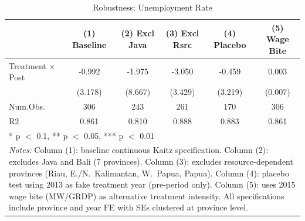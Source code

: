 \begin{table}
\centering
\caption{Robustness: Unemployment Rate}
\label{tab:robustness}
\centering\small
\begin{tabular}[t]{lccccc}
\toprule
  & (1) Baseline & (2) Excl Java & (3) Excl Rsrc & (4) Placebo & (5) Wage Bite\\
\midrule
Treatment $\times$ Post & -0.992 & -1.975 & -3.050 & -0.459 & 0.003\\
 & (3.178) & (8.667) & (3.429) & (3.219) & (0.007)\\
\midrule
Num.Obs. & 306 & 243 & 261 & 170 & 306\\
R2 & 0.861 & 0.810 & 0.888 & 0.883 & 0.861\\
\bottomrule
\multicolumn{6}{l}{\rule{0pt}{1em}* p $<$ 0.1, ** p $<$ 0.05, *** p $<$ 0.01}\\
\multicolumn{6}{p{0.95\textwidth}}{\rule{0pt}{1em}\textit{Notes:} Column (1): baseline continuous Kaitz specification. Column (2): excludes Java and Bali (7 provinces). Column (3): excludes resource-dependent provinces (Riau, E./N.\ Kalimantan, W.\ Papua, Papua). Column (4): placebo test using 2013 as fake treatment year (pre-period only). Column (5): uses 2015 wage bite (MW/GRDP) as alternative treatment intensity. All specifications include province and year FE with SEs clustered at province level.}\\
\end{tabular}
\end{table}
